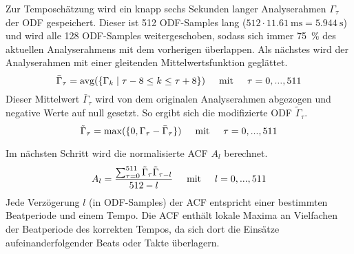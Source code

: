 {{{			%
			Zur Temposchätzung wird ein knapp sechs Sekunden langer Analyserahmen $\Gamma_\tau$ der \ac{ODF} gespeichert.
			Dieser ist \num{512} \ac{ODF}-Samples lang ($512 \cdot \SI{11.61}{\milli\second} = \SI{5.944}{\second} $)
				und wird alle \num{128} \ac{ODF}-Samples weitergeschoben,
				sodass sich immer \SI{75}{\percent} des aktuellen Analyserahmens mit dem vorherigen überlappen.
			Als nächstes wird der Analyserahmen mit einer gleitenden Mittelwertsfunktion geglättet.
			\begin{equation}
				\bar{\Gamma}_\tau = \text{avg}(\{\Gamma_k \mid \tau - 8 \leq k \leq \tau + 8 \})
				\text{\hspace{5mm}mit\hspace{5mm}} \tau = 0, ..., 511
			\end{equation}
			Dieser Mittelwert $\bar{\Gamma}_\tau$ wird von dem originalen Analyserahmen abgezogen und negative Werte auf null gesetzt.
			So ergibt sich die modifizierte \ac{ODF} $\tilde{\Gamma}_\tau$.
			\begin{equation}
				\tilde{\Gamma}_\tau = \max(\{0, \Gamma_\tau - \bar{\Gamma}_\tau\})
				\text{\hspace{5mm}mit\hspace{5mm}} \tau = 0, ..., 511
			\end{equation}

			Im nächsten Schritt wird die normalisierte \ac{ACF} $A_l$ berechnet.
			\begin{equation}
				A_l = \frac{\sum_{\tau = 0}^{511} \tilde{\Gamma}_\tau \tilde{\Gamma}_{\tau - l}}{512 - l}
				\text{\hspace{5mm}mit\hspace{5mm}} l = 0, ..., 511
			\end{equation}
			Jede Verzögerung $l$ (in \ac{ODF}-Samples) der \ac{ACF} entspricht einer bestimmten Beatperiode und einem Tempo.
			Die \ac{ACF} enthält lokale Maxima an Vielfachen der Beatperiode des korrekten Tempos,
				da sich dort die Einsätze aufeinanderfolgender Beats oder Takte überlagern.

}}}
